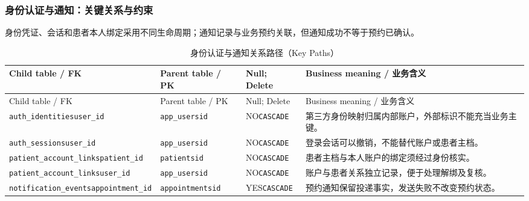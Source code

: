 \subsubsection{身份认证与通知：关键关系与约束}
身份凭证、会话和患者本人绑定采用不同生命周期；通知记录与业务预约关联，但通知成功不等于预约已确认。

\begingroup\footnotesize\setlength{\tabcolsep}{3pt}
\begin{longtable}{@{}L{43mm}L{32mm}L{24mm}L{49mm}@{}}
\caption{身份认证与通知关系路径（Key Paths）}\label{tab:domain-key-02}\\\toprule
Child table / FK & Parent table / PK & Null; Delete & Business meaning / 业务含义\\\midrule\endfirsthead
\toprule Child table / FK & Parent table / PK & Null; Delete & Business meaning / 业务含义\\\midrule\endhead
\texttt{auth\_identities}\newline\texttt{user\_id} & \texttt{app\_users}\newline\texttt{id} & NO\newline\texttt{CASCADE} & 第三方身份映射归属内部账户，外部标识不能充当业务主键。\\
\texttt{auth\_sessions}\newline\texttt{user\_id} & \texttt{app\_users}\newline\texttt{id} & NO\newline\texttt{CASCADE} & 登录会话可以撤销，不能替代账户或患者主档。\\
\texttt{patient\_account\_links}\newline\texttt{patient\_id} & \texttt{patients}\newline\texttt{id} & NO\newline\texttt{CASCADE} & 患者主档与本人账户的绑定须经过身份核实。\\
\texttt{patient\_account\_links}\newline\texttt{user\_id} & \texttt{app\_users}\newline\texttt{id} & NO\newline\texttt{CASCADE} & 账户与患者关系独立记录，便于处理解绑及复核。\\
\texttt{notification\_events}\newline\texttt{appointment\_id} & \texttt{appointments}\newline\texttt{id} & YES\newline\texttt{CASCADE} & 预约通知保留投递事实，发送失败不改变预约状态。\\
\bottomrule\end{longtable}\endgroup


